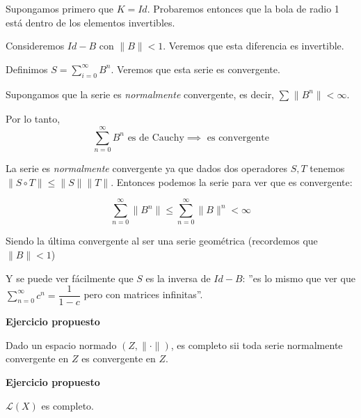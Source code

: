 \documentclass[openany]{book}
\begin{document}
\begin{demonstration}
    Supongamos primero que $ K = Id$. Probaremos entonces que la bola de radio 1 está dentro de los elementos invertibles.

    Consideremos $ Id-B$ con $ \|B\|<1$. Veremos que esta diferencia es invertible. 

    Definimos $ S = \sum\limits_{i=0}^{\infty} B^{n}$. Veremos que esta serie es convergente.

    Supongamos que la serie es \textit{normalmente} convergente, es decir, $ \sum\limits_{}^{} \|B^{n}\| < \infty$.
    
    Por lo tanto,
    $$ \sum\limits_{n=0}^{\infty}B^{n} \text{ es de Cauchy} \implies \text{ es convergente} $$ 

    La serie es \textit{normalmente} convergente ya que dados dos operadores $ S,T$ tenemos $ \| S \circ T \| \leq  \|S\|\|T\|$. Entonces podemos la serie para ver que es convergente:

    $$ \sum\limits_{n=0}^{\infty}\|B^{n}\| \leq  \sum\limits_{n=0}^{\infty}\|B\|^{n} < \infty $$

    Siendo la última convergente al ser una serie geométrica (recordemos que $ \|B\| < 1$)

    Y se puede ver fácilmente que $ S$ es la inversa de $ Id-B$: ''es lo mismo que ver que $ \sum\limits_{n=0}^{\infty}c^{n} = \dfrac{1}{1-c}$ pero con matrices infinitas''. 

\end{demonstration}

\begin{exercise}
    \textbf{Ejercicio propuesto}

    Dado un espacio normado $ (Z,\|\cdot \|)$, es completo sii toda serie normalmente convergente en $ Z$ es convergente en $ Z$.
\end{exercise}

\begin{exercise}
    \textbf{Ejercicio propuesto}

    $ \mathcal{L}(X)$ es completo.
\end{exercise}
\end{document}
